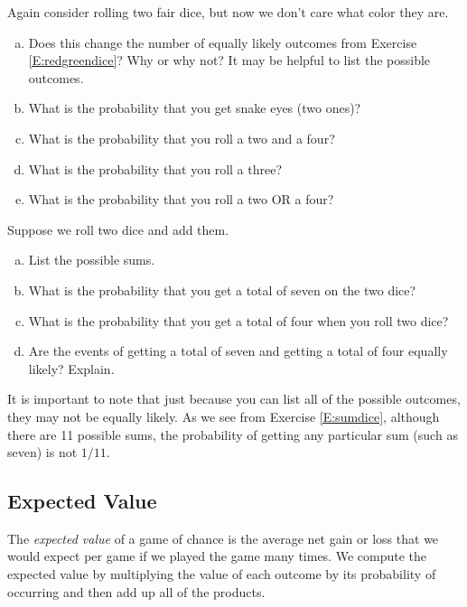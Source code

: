 \begin{xca}\label{E:twodice}
Again consider rolling two fair dice, but now we don't care what color they are. 
\begin{enumerate}[(a)]
\item Does this change the number of equally likely outcomes from Exercise \ref{E:redgreendice}? Why or why not? It may be helpful to list the possible outcomes.
\item What is the probability that you get snake eyes (two ones)?
\item What is the probability that you roll a two and a four? 
\item What is the probability  that you roll a three? 
\item What is the probability that you roll a two OR a four?
\end{enumerate}
\end{xca}

\begin{xca}\label{E:sumdice}
Suppose we roll two dice and add them.
\begin{enumerate}[(a)]
\item List the possible sums.
\item What is the probability that you get a total of seven on the two dice?
\item  What is the probability that you get a total of four when you roll two dice?
\item Are the events of getting a total of seven and getting a total of four equally likely? Explain.

\end{enumerate}
\end{xca}


It is important to note that just because you can list all of the possible outcomes, they may not be equally likely. As we see from Exercise \ref{E:sumdice}, although there are 11 possible sums, the probability of getting any particular sum (such as seven) is not $1/11$. 

\subsection{Expected Value}
\vspace{.1in}

\begin{definition}\label{D:expectedvalue}
The \emph{expected value} of a game of chance is the average net gain or loss that we would expect per game if we played the game many times. We compute the expected value by multiplying the value of each outcome by its probability of occurring and then add up all of the products.
\end{definition}

